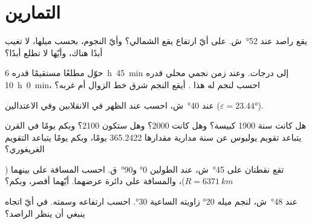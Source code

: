 \section{التمارين}

\begin{exercise}[$\star$]\label{exo:b1:spherical-astronomy:1}
يقع راصد عند  \ang{52}~ش. على أيّ ارتفاع يقع  الشمالي؟ وأيّ النجوم، بحسب ميلها، لا تغيب أبدًا هناك، وأيّها لا تطلع أبدًا؟
\end{exercise}

\begin{exercise}[$\star$]\label{exo:b1:spherical-astronomy:2}
حوّل مطلعًا مستقيمًا قدره \qty{6}{h}~\qty{45}{min} إلى درجات. وعند زمن نجمي محلي قدره \qty{10}{h}~\qty{0}{min}، احسب  لنجم له هذا . أيقع النجم شرق خط الزوال أم غربه؟
\end{exercise}

\begin{exercise}[$\star$]\label{exo:b1:spherical-astronomy:3}
عند  \ang{40}~ش، احسب  عند الظهر في الانقلابين وفي الاعتدالين ($\varepsilon = \ang{23.44}$).
\end{exercise}

\begin{exercise}[$\star$]\label{exo:b1:spherical-astronomy:4}
هل كانت سنة 1900 كبيسة؟ وهل كانت 2000؟ وهل ستكون 2100؟ وبكم يومًا في القرن يتباعد تقويم يوليوس عن سنة مدارية مقدارها 365.2422 يومًا، وبكم يومًا يتباعد التقويم الغريغوري؟
\end{exercise}

\begin{exercise}[$\star\star$]\label{exo:b1:spherical-astronomy:5}
تقع نقطتان على  \ang{45}~ش، عند الطولين \ang{0} و\ang{90}~ق. احسب المسافة على  بينهما ($R = \qty{6371}{km}$)، والمسافة على دائرة عرضهما. أيّهما أقصر، وبكم؟
\end{exercise}

\begin{exercise}[$\star\star$]\label{exo:b1:spherical-astronomy:6}
عند  \ang{48}~ش، لنجم ميله \ang{20} زاويته الساعية \ang{30}. احسب ارتفاعه وسمته. في أيّ اتجاه ينبغي أن ينظر الراصد؟
\end{exercise}


